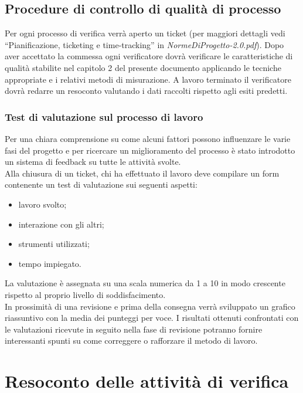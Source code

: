 \section{Procedure di controllo di qualit\`a di processo}
Per ogni processo di verifica verr\`a aperto un ticket (per maggiori dettagli vedi
``Pianificazione, ticketing e time-tracking'' in \emph{NormeDiProgetto-2.0.pdf}). Dopo aver
accettato la commessa ogni verificatore dovr\`a verificare le caratteristiche di
qualit\`a stabilite nel capitolo 2 del presente documento applicando le tecniche
appropriate e i relativi metodi di misurazione. A lavoro terminato il
verificatore dovr\`a redarre un resoconto valutando i dati raccolti rispetto agli
esiti predetti.

\subsection{Test di valutazione sul processo di lavoro}
Per una chiara comprensione su come alcuni fattori possono influenzare le varie
fasi del progetto e per ricercare un miglioramento del processo \`e
stato introdotto un sistema di feedback su tutte le attivit\`a svolte. \\
Alla chiusura di un ticket, chi ha effettuato il lavoro deve compilare un form
contenente un test di valutazione sui seguenti aspetti:

\begin{itemize}
\item lavoro svolto;
\item interazione con gli altri;
\item strumenti utilizzati;
\item tempo impiegato.
\end{itemize}

La valutazione \`e assegnata su una scala numerica da 1 a 10 in modo crescente
rispetto al proprio livello di soddisfacimento. \\
In prossimit\`a di una revisione e prima della consegna verr\`a sviluppato un
grafico riassuntivo con la media dei punteggi per voce. 
I risultati ottenuti confrontati con le valutazioni ricevute in seguito nella
fase di revisione potranno fornire interessanti spunti su come correggere o
rafforzare il metodo di lavoro.




\chapter{Resoconto delle attivit\`a di verifica}
\thispagestyle{fancy} %

